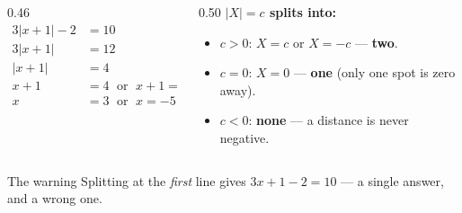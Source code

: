 \documentclass[aspectratio=169, 11pt]{beamer}
\begin{document}
\begin{frame}[t, plain]
  \begin{columns}[T]
    \begin{column}{0.46\textwidth}
      \begin{align*}
        3|x+1| - 2 &= 10 \\
        3|x+1| &= 12 \\
        |x+1| &= 4 \\
        x+1 &= 4 \;\text{ or }\; x+1 = -4 \\
        x &= 3 \;\text{ or }\; x = -5
      \end{align*}
    \end{column}
    \begin{column}{0.50\textwidth}
      \textbf{$|X| = c$ splits into:}
      \begin{itemize}\setlength{\itemsep}{4pt}
        \item $c>0$: \; $X=c$ or $X=-c$ --- \textbf{two}.
        \item $c=0$: \; $X=0$ --- \textbf{one} (only one spot is zero away).
        \item $c<0$: \; \textbf{none} --- a distance is never negative.
      \end{itemize}
    \end{column}
  \end{columns}
  \vspace{5pt}
  \begin{block}{The warning}
    Splitting at the \emph{first} line gives $3x+1-2=10$ --- a single answer, and a wrong one.
  \end{block}
\end{frame}
\end{document}
